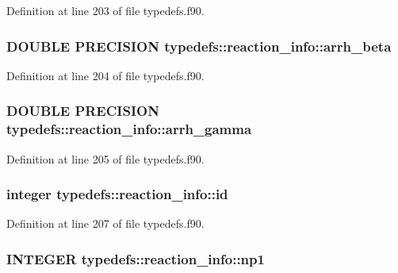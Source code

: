 Definition at line 203 of file typedefs.f90.\hypertarget{typetypedefs_1_1reaction__info_a4b7eb7e54ae72131312af6f924f7e373}{
\subsubsection[{arrh\_\-beta}]{\setlength{\rightskip}{0pt plus 5cm}DOUBLE PRECISION {\bf typedefs::reaction\_\-info::arrh\_\-beta}}}
\label{typetypedefs_1_1reaction__info_a4b7eb7e54ae72131312af6f924f7e373}


Definition at line 204 of file typedefs.f90.\hypertarget{typetypedefs_1_1reaction__info_ab603464ac8abe01ac6567ff26759aad7}{
\subsubsection[{arrh\_\-gamma}]{\setlength{\rightskip}{0pt plus 5cm}DOUBLE PRECISION {\bf typedefs::reaction\_\-info::arrh\_\-gamma}}}
\label{typetypedefs_1_1reaction__info_ab603464ac8abe01ac6567ff26759aad7}


Definition at line 205 of file typedefs.f90.\hypertarget{typetypedefs_1_1reaction__info_adf314158a153373fe50530ea4765d27b}{
\subsubsection[{id}]{\setlength{\rightskip}{0pt plus 5cm}integer {\bf typedefs::reaction\_\-info::id}}}
\label{typetypedefs_1_1reaction__info_adf314158a153373fe50530ea4765d27b}


Definition at line 207 of file typedefs.f90.\hypertarget{typetypedefs_1_1reaction__info_a416d1c8efe1f3cf0bd338aa6aa405e16}{
\subsubsection[{np1}]{\setlength{\rightskip}{0pt plus 5cm}INTEGER {\bf typedefs::reaction\_\-info::np1}}}
\label{typetypedefs_1_1reaction__info_a416d1c8efe1f3cf0bd338aa6aa405e16}


